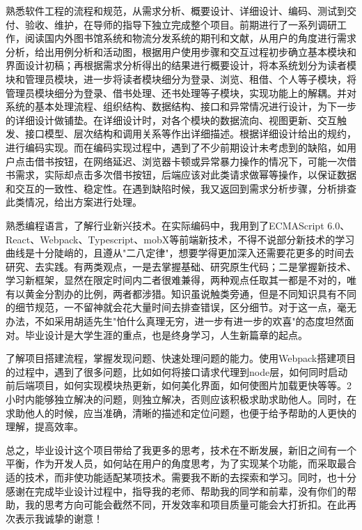 熟悉软件工程的流程和规范，从需求分析、概要设计、详细设计、编码、测试到交付、验收、维护，在导师的指导下独立完成整个项目。前期进行了一系列调研工作，阅读国内外图书馆系统和物流分发系统的期刊和文献，从用户的角度进行需求分析，给出用例分析和活动图，根据用户使用步骤和交互过程初步确立基本模块和界面设计初稿；再根据需求分析得出的结果进行概要设计，将本系统划分为读者模块和管理员模块，进一步将读者模块细分为登录、浏览、租借、个人等子模块，将管理员模块细分为登录、借书处理、还书处理等子模块，实现功能上的解耦。并对系统的基本处理流程、组织结构、数据结构、接口和异常情况进行设计，为下一步的详细设计做铺垫。在详细设计时，对各个模块的数据流向、视图更新、交互触发、接口模型、层次结构和调用关系等作出详细描述。根据详细设计给出的规约，进行编码实现。而在编码实现过程中，遇到了不少前期设计未考虑到的缺陷，如用户点击借书按钮，在网络延迟、浏览器卡顿或异常暴力操作的情况下，可能一次借书需求，实际却点击多次借书按钮，后端应该对此类请求做幂等操作，以保证数据和交互的一致性、稳定性。在遇到缺陷时候，我又返回到需求分析步骤，分析排查此类情况，给出方案进行处理。

熟悉编程语言，了解行业新兴技术。在实际编码中，我用到了ECMAScript 6.0、React、Webpack、Typescript、mobX等前端新技术，不得不说部分新技术的学习曲线是十分陡峭的，且遵从"二八定律"，想要学得更加深入还需要花更多的时间去研究、去实践。有两类观点，一是去掌握基础、研究原生代码；二是掌握新技术、学习新框架，显然在限定时间内二者很难兼得，两种观点任取其一都是不对的，唯有以黄金分割办的比例，两者都涉猎。知识虽说触类旁通，但是不同知识具有不同的细节规范，一不留神就会花大量时间去排查错误，区分细节。对于这一点，毫无办法，不如采用胡适先生"怕什么真理无穷，进一步有进一步的欢喜"的态度坦然面对。毕业设计是大学生涯的重点，也是终身学习，人生新篇章的起点。

了解项目搭建流程，掌握发现问题、快速处理问题的能力。使用Webpack搭建项目的过程中，遇到了很多问题，比如如何将接口请求代理到node层，如何同时启动前后端项目，如何实现模块热更新，如何美化界面，如何使图片加载更快等等。2小时内能够独立解决的问题，则独立解决，否则应该积极求助求助他人。同时，在求助他人的时候，应当准确，清晰的描述和定位问题，也便于给予帮助的人更快的理解，提高效率。

总之，毕业设计这个项目带给了我更多的思考，技术在不断发展，新旧之间有一个平衡，作为开发人员，如何站在用户的角度思考，为了实现某个功能，而采取最合适的技术，而非使功能适配某项技术。需要我不断的去探索和学习。同时，也十分感谢在完成毕业设计过程中，指导我的老师、帮助我的同学和前辈，没有你们的帮助，我的思考方向可能会截然不同，开发效率和项目质量可能会大打折扣。在此再次表示我诚挚的谢意！
